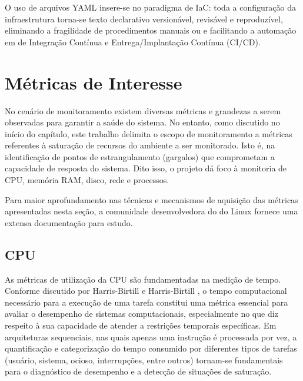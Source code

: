 O uso de arquivos YAML insere-se no paradigma de IaC: toda a configuração da infraestrutura torna-se texto declarativo versionável, revisável e reproduzível, eliminando a fragilidade de procedimentos manuais ou  e facilitando a automação em  de Integração Contínua e Entrega/Implantação Contínua (CI/CD).


\section{Métricas de Interesse}
\label{section:Metricas}

No cenário de monitoramento existem diversas métricas e grandezas a serem observadas para garantir a saúde do sistema. No entanto, como discutido no início do capítulo, este trabalho delimita o escopo de monitoramento a métricas referentes à saturação de recursos do ambiente a ser monitorado. Isto é, na identificação de pontos de estrangulamento (gargalos) que comprometam a capacidade de resposta do sistema. Dito isso, o projeto dá foco à monitoria de CPU, memória RAM, disco, rede e processos.

Para maior aprofundamento nas técnicas e mecanismos de aquisição das métricas apresentadas nesta seção, a comunidade desenvolvedora do  do Linux fornece uma extensa documentação \citep{linuxkernel2025} para estudo. {
}

\subsection{CPU}
\label{subsection:CPU}

As métricas de utilização da CPU \citep{cpumetrics2025} são fundamentadas na medição de tempo. Conforme discutido por Harris-Birtill e Harris-Birtill \citep{harris-birtill2021}, o tempo computacional necessário para a execução de uma tarefa constitui uma métrica essencial para avaliar o desempenho de sistemas computacionais, especialmente no que diz respeito à sua capacidade de atender a restrições temporais específicas. Em arquiteturas sequenciais, nas quais apenas uma instrução é processada por vez, a quantificação e categorização do tempo consumido por diferentes tipos de tarefas (usuário, sistema, ocioso, interrupções, entre outros) tornam-se fundamentais para o diagnóstico de desempenho e a detecção de situações de saturação.

